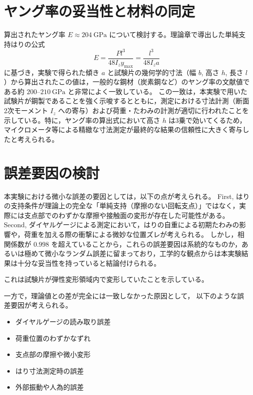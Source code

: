 \documentclass[10pt,a4paper,titlepage]{jreport}
\begin{document}
\section{ヤング率の妥当性と材料の同定}
算出されたヤング率 $E \approx 204\ \mathrm{GPa}$ について検討する。理論章で導出した単純支持はりの公式
\begin{equation}
    E = \frac{Pl^3}{48 I_z y_{\max}} = \frac{l^3}{48 I_z a}
\end{equation}
に基づき，実験で得られた傾き $a$ と試験片の幾何学的寸法（幅 $b$, 高さ $h$, 長さ $l$）から算出されたこの値は，一般的な鋼材（炭素鋼など）のヤング率の文献値である約 $200\text{--}210\ \mathrm{GPa}$ と非常によく一致している。
この一致は，本実験で用いた試験片が鋼製であることを強く示唆するとともに，測定における寸法計測（断面2次モーメント $I_z$ への寄与）および荷重・たわみの計測が適切に行われたことを示している。特に，ヤング率の算出式において高さ $h$ は3乗で効いてくるため，マイクロメータ等による精緻な寸法測定が最終的な結果の信頼性に大きく寄与したと考えられる。

\section{誤差要因の検討}
本実験における微小な誤差の要因としては，以下の点が考えられる。
First, はりの支持条件が理論上の完全な「単純支持（摩擦のない回転支点）」ではなく，実際には支点部でのわずかな摩擦や接触面の変形が存在した可能性がある。
Second, ダイヤルゲージによる測定において，はりの自重による初期たわみの影響や，荷重を加える際の衝撃による微妙な位置ズレが考えられる。
しかし，相関係数が $0.998$ を超えていることから，これらの誤差要因は系統的なものか，あるいは極めて微小なランダム誤差に留まっており，工学的な観点からは本実験結果は十分な妥当性を持っていると結論付けられる。

これは試験片が弾性変形領域内で変形していたことを示している。

一方で，理論値との差が完全には一致しなかった原因として，
以下のような誤差要因が考えられる。

\begin{itemize}
    \item ダイヤルゲージの読み取り誤差
    \item 荷重位置のわずかなずれ
    \item 支点部の摩擦や微小変形
    \item はり寸法測定時の誤差
    \item 外部振動や人為的誤差
\end{itemize}
\end{document}
